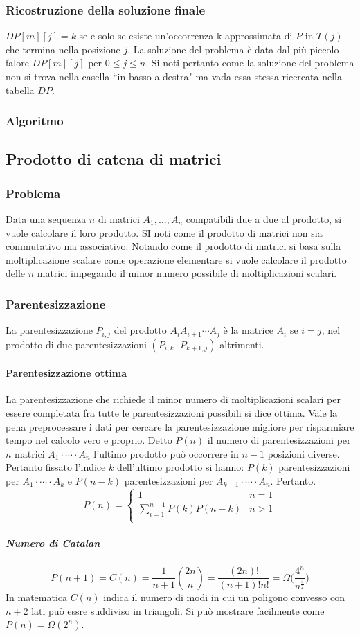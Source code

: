 \subsubsection{Ricostruzione della soluzione finale}
$DP[m][j] = k$ se e solo se esiste un'occorrenza k-approssimata di $P$ in $T(j)$ che termina nella posizione $j$. La soluzione del problema \`e data dal pi\`u piccolo falore $DP[m][j]$ 
per $0\le j\le n$. Si noti pertanto come la soluzione del problema non si trova nella casella ``in basso a destra" ma vada essa stessa ricercata nella tabella $DP$.
\subsubsection{Algoritmo}

\subsection{Prodotto di catena di matrici}
\subsubsection{Problema}
Data una sequenza $n$ di matrici $A_1, \dots, A_n$ compatibili due a due al prodotto, si vuole calcolare il loro prodotto. SI noti come il prodotto di 
matrici non sia commutativo ma associativo. Notando come il prodotto di matrici si basa sulla moltiplicazione scalare come operazione elementare si vuole
calcolare il prodotto delle $n$ matrici impegando il minor numero possibile di moltiplicazioni scalari. 
\subsubsection{Parentesizzazione}
La parentesizzazione $P_{i, j}$ del prodotto $A_i\dot A_{i+1}\cdots A_j$ \`e la matrice $A_i$ se $i=j$, nel prodotto di due parentesizzazioni $(P_{i,k}
\cdot P_{k+1, j})$ altrimenti. 
\paragraph{Parentesizzazione ottima}
La parentesizzazione che richiede il minor numero di moltiplicazioni scalari per essere completata fra tutte le parentesizzazioni possibili si dice 
ottima. Vale la pena preprocessare i dati per cercare la parentesizzazione migliore per risparmiare tempo nel calcolo vero e proprio. Detto $P(n)$ il
numero di parentesizzazioni per $n$ matrici $A_1\cdot\cdots\cdot A_n$ l'ultimo prodotto pu\`o occorrere in $n-1$ posizioni diverse. Pertanto fissato 
l'indice $k$ dell'ultimo prodotto si hanno: $P(k)$ parentesizzazioni per $A_1\cdot\cdots\cdot A_k$ e $P(n-k)$ parentesizzazioni per  $A_{k+1}\cdot\cdots
\cdot A_n$. Pertanto.
$$P(n) = 
\begin{cases}
	1 & n =1 \\
	\sum\limits_{i = 1}^{n-1} P(k)P(n-k) & n > 1\\
\end{cases}$$
\subparagraph{Numero di Catalan}
$$P(n+1) = C(n) = \dfrac{1}{n+1}\binom{2n}{n} = \dfrac{(2n)!}{(n+1)!n!} = \Omega\biggl(\dfrac{4^n}{n^{\frac{3}{2}}}\biggr)$$
In matematica $C(n)$ indica il numero di modi in cui un poligono convesso con $n+2$ lati pu\`o essre suddiviso in triangoli. Si pu\`o mostrare facilmente
come $P(n)=\Omega(2^n)$. 
